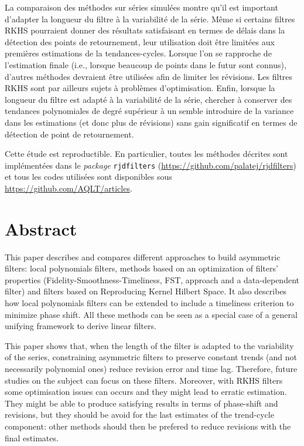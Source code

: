 \documentclass[
  12pt,
  a4paper,french]{article}
\newcommand\1{\mathds{1}}
\begin{document}
La comparaison des méthodes sur séries simulées montre qu'il est
important d'adapter la longueur du filtre à la variabilité de la série.
Même si certains filtres RKHS pourraient donner des résultats
satisfaisant en termes de délais dans la détection des points de
retournement, leur utilisation doit être limitées aux premières
estimations de la tendances-cycles. Lorsque l'on se rapproche de
l'estimation finale (i.e., lorsque beaucoup de points dans le futur sont
connus), d'autres méthodes devraient être utilisées afin de limiter les
révisions. Les filtres RKHS sont par ailleurs sujets à problèmes
d'optimisation. Enfin, lorsque la longueur du filtre est adapté à la
variabilité de la série, chercher à conserver des tendances polynomiales
de degré supérieur à un semble introduire de la variance dans les
estimations (et donc plus de révisions) sans gain significatif en termes
de détection de point de retournement.

Cette étude est reproductible. En particulier, toutes les méthodes
décrites sont implémentées dans le \emph{package} 
\texttt{rjdfilters} (\url{https://github.com/palatej/rjdfilters}) et
tous les codes utilisées sont disponibles sous
\url{https://github.com/AQLT/articles}.

\hypertarget{abstract}{%
\section*{Abstract}\label{abstract}}

This paper describes and compares different approaches to build
asymmetric filters: local polynomials filters, methods based on an
optimization of filters' properties (Fidelity-Smoothness-Timeliness,
FST, approach and a data-dependent filter) and filters based on
Reproducing Kernel Hilbert Space. It also describes how local
polynomials filters can be extended to include a timeliness criterion to
minimize phase shift. All these methods can be seen as a special case of
a general unifying framework to derive linear filters.

This paper shows that, when the length of the filter is adapted to the
variability of the series, constraining asymmetric filters to preserve
constant trends (and not necessarily polynomial ones) reduce revision
error and time lag. Therefore, future studies on the subject can focus
on these filters. Moreover, with RKHS filters some optimisation issues
can occurs and they might lead to erratic estimation. They might be able
to produce satisfying results in terms of phase-shift and revisions, but
they should be avoid for the last estimates of the trend-cycle
component: other methods should then be prefered to reduce revisions
with the final estimates.
\end{document}
